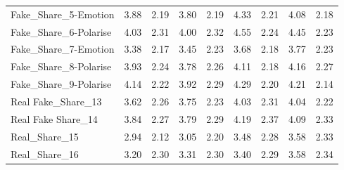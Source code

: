 \documentclass[empirical, authordate, issue]{jote-new-article}
\begin{document}
\begin{table}
\begin{tabularx}{\linewidth}{@{} X  S S S S | S S S S@{}}
    Fake\_Share\_5-Emotion   & 3.88                                           & 2.19                                         & 3.80           & 2.19            & 4.33          & 2.21           & 4.08           & 2.18            \\
    Fake\_Share\_6-Polarise  & 4.03                                           & 2.31                                         & 4.00           & 2.32            & 4.55          & 2.24           & 4.45           & 2.23            \\
    Fake\_Share\_7-Emotion   & 3.38                                           & 2.17                                         & 3.45           & 2.23            & 3.68          & 2.18           & 3.77           & 2.23            \\
    Fake\_Share\_8-Polarise  & 3.93                                           & 2.24                                         & 3.78           & 2.26            & 4.11          & 2.18           & 4.16           & 2.27            \\
    Fake\_Share\_9-Polarise  & 4.14                                           & 2.22                                         & 3.92           & 2.29            & 4.29          & 2.20           & 4.21           & 2.14            \\
    Real Fake\_Share\_13     & 3.62                                           & 2.26                                         & 3.75           & 2.23            & 4.03          & 2.31           & 4.04           & 2.22            \\
    Real Fake Share\_14      & 3.84                                           & 2.27                                         & 3.79           & 2.29            & 4.19          & 2.37           & 4.09           & 2.33            \\
    Real\_Share\_15          & 2.94                                           & 2.12                                         & 3.05           & 2.20            & 3.48          & 2.28           & 3.58           & 2.33            \\
    Real\_Share\_16          & 3.20                                           & 2.30                                         & 3.31           & 2.30            & 3.40          & 2.29           & 3.58           & 2.34            \\
    \bottomrule
  \end{tabularx}


\end{table}
\end{document}
